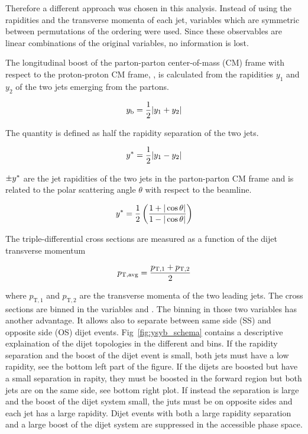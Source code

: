 Therefore a different approach was chosen in this analysis. Instead of using the
rapidities and the transverse momenta of each jet, variables which are symmetric
between permutations of the ordering were used. Since these observables are
linear combinations of the original variables, no information is lost.

The longitudinal boost of the parton-parton center-of-mass (CM) frame with
respect to the proton-proton CM frame, \yboost, is calculated from the
rapidities $y_1$ and $y_2$ of the two jets emerging from the partons. 

\begin{equation*}
    y_{\mathrm{b}} = \frac{1}{2} |y_1 + y_2|
\end{equation*}

The quantity \ystar is defined as half the rapidity separation of the two jets.

\begin{equation*}
    y^* = \frac{1}{2} |y_1 - y_2|
\end{equation*}

$\pm y^*$ are the jet rapidities of the two jets in the parton-parton CM frame
and is related to the polar scattering angle $\theta$ with respect to the
beamline. 

\begin{equation*}
    y^* = \frac{1}{2} \left( \frac{1 + |\cos \theta|}{1- | \cos \theta|}
    \right)
\end{equation*}


The triple-differential cross sections are measured as a function of the dijet
transverse momentum \ptavg

\begin{equation*}
    p_{\mathrm{T,avg}} = \frac{p_{\mathrm{T},1} + p_{\mathrm{T},2}}{2}
\end{equation*}


where $p_{\mathrm{T},1}$ and $p_{\mathrm{T},2}$ are the transverse momenta of
the two leading jets. The cross sections are binned in the variables \ystar and
\yboost. The binning in those two variables has another advantage. It allows
also to separate between same side (SS) and opposite side (OS) dijet events.
Fig~\ref{fig:ysyb_schema} contains a descriptive explaination of the dijet topologies
in the different \ystar and \yboost bins. If the rapidity separation and the
boost of the dijet event is small, both jets must have a low rapidity, see the
bottom left part of the figure. If the dijets are boosted but have a small
separation in rapity, they must be boosted in the forward region but both jets
are on the same side, see bottom right plot. If instead the separation is large
and the boost of the dijet system small, the juts must be on opposite sides and
each jet has a large rapidity. Dijet events with both a large rapidity
separation and a large boost of the dijet system are suppressed in the
accessible phase space.

